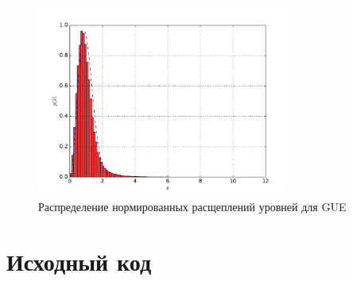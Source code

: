 \documentclass[a4paper]{article}
\begin{document}
\begin{figure}[H]
	\center
	\includegraphics[width=0.75\textwidth]{../pictures/lab4_gue_spacing_hist.pdf}
	\caption{Распределение нормированных расщеплений уровней для GUE}
	\label{fig:gue_spacing}
\end{figure}


\section{Исходный код}

\end{document}
